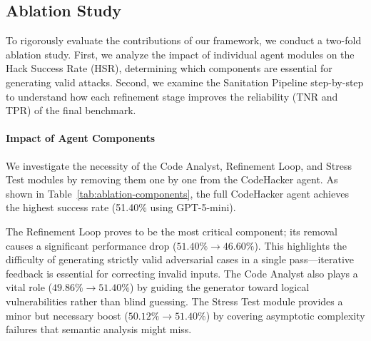 \documentclass[11pt]{article}
\begin{document}
\subsection{Ablation Study}
To rigorously evaluate the contributions of our framework, we conduct a two-fold ablation study. First, we analyze the impact of individual agent modules on the Hack Success Rate (HSR), determining which components are essential for generating valid attacks. Second, we examine the Sanitation Pipeline step-by-step to understand how each refinement stage improves the reliability (TNR and TPR) of the final benchmark.

\paragraph{Impact of Agent Components}
We investigate the necessity of the Code Analyst, Refinement Loop, and Stress Test modules by removing them one by one from the CodeHacker agent. As shown in Table~\ref{tab:ablation-components}, the full CodeHacker agent achieves the highest success rate (51.40\% using GPT-5-mini).

\begin{table}[h]
\centering
{}
\caption{Ablation study of CodeHacker agent components.}
\label{tab:ablation-components}
\vspace{-0.3cm}
\end{table}

The Refinement Loop proves to be the most critical component; its removal causes a significant performance drop ($51.40\% \to 46.60\%$). This highlights the difficulty of generating strictly valid adversarial cases in a single pass—iterative feedback is essential for correcting invalid inputs. The Code Analyst also plays a vital role ($49.86\% \to 51.40\%$) by guiding the generator toward logical vulnerabilities rather than blind guessing. The Stress Test module provides a minor but necessary boost ($50.12\% \to 51.40\%$) by covering asymptotic complexity failures that semantic analysis might miss.
\end{document}
